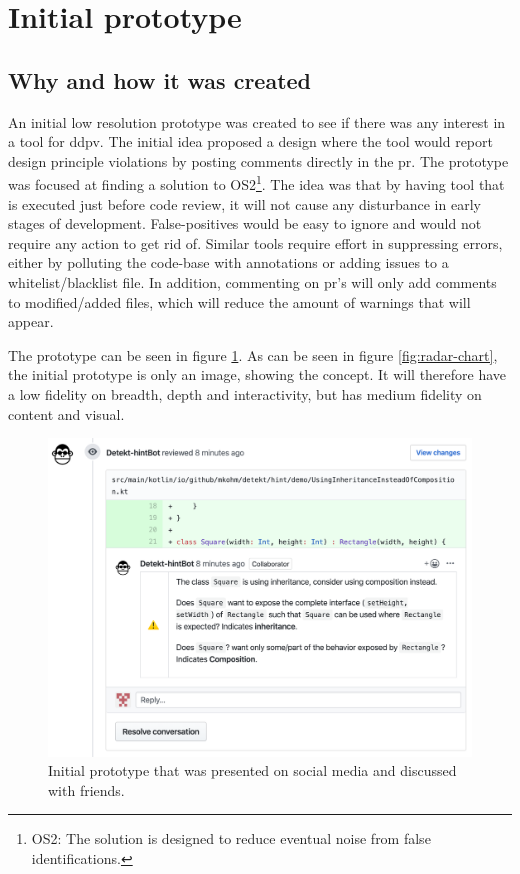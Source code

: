 \documentclass[pdftex,10pt,b5paper,twoside]{report}
\begin{document}
\section{Initial prototype}
\label{initial-prototype}
\subsection*{Why and how it was created}
An initial low resolution prototype was created to see if there was any interest in a tool for \gls{ddpv}. The initial idea proposed a design where the tool would report design principle violations by posting comments directly in the \gls{pr}. The prototype was focused at finding a solution to OS2\footnote{OS2: The solution is designed to reduce eventual noise from false identifications.}. The idea was that by having tool that is executed just before code review, it will not cause any disturbance in early stages of development. False-positives would be easy to ignore and would not require any action to get rid of. Similar tools require effort in suppressing errors, either by polluting the code-base with annotations or adding issues to a whitelist/blacklist file. In addition, commenting on \gls{pr}'s will only add comments to modified/added files, which will reduce the amount of warnings that will appear.  

The prototype can be seen in figure \ref{fig:mockup}. As can be seen in figure \ref{fig:radar-chart}, the initial prototype is only an image, showing the concept. It will therefore have a low fidelity on breadth, depth and interactivity, but has medium fidelity on content and visual. 


\begin{figure}[h!]
    \centering
    \includegraphics[width=\textwidth]{../images/demo.png}
    \caption{Initial prototype that was presented on social media and discussed with friends.}
    \label{fig:mockup}
\end{figure}
\end{document}
